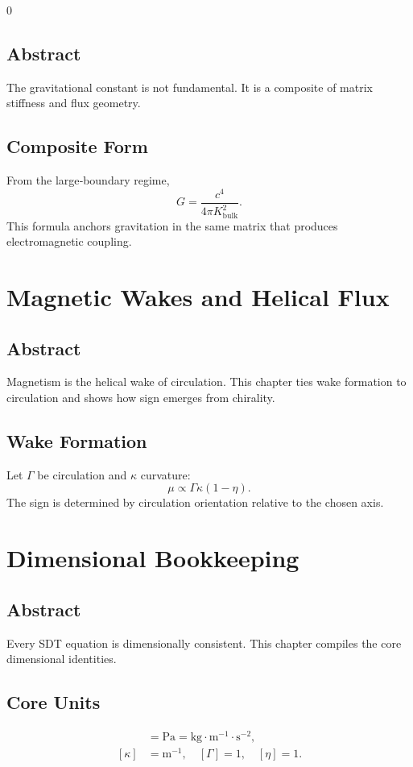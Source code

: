 0\documentclass[12pt]{book}
\begin{document}
\section*{Abstract}
The gravitational constant is not fundamental. It is a composite of matrix stiffness and flux geometry.

\section{Composite Form}
From the large‑boundary regime,
\begin{equation}
G = \frac{c^4}{4\pi K_{\text{bulk}}^2}.
\end{equation}
This formula anchors gravitation in the same matrix that produces electromagnetic coupling.

\chapter{Magnetic Wakes and Helical Flux}

\section*{Abstract}
Magnetism is the helical wake of circulation. This chapter ties wake formation to circulation and shows
how sign emerges from chirality.

\section{Wake Formation}
Let $\Gamma$ be circulation and $\kappa$ curvature:
\begin{equation}
\mu \propto \Gamma \kappa (1-\eta).
\end{equation}
The sign is determined by circulation orientation relative to the chosen axis.

\chapter{Dimensional Bookkeeping}

\section*{Abstract}
Every SDT equation is dimensionally consistent. This chapter compiles the core dimensional identities.

\section{Core Units}
\begin{align}
[P] &= \text{Pa} = \text{kg}\cdot \text{m}^{-1}\cdot \text{s}^{-2},\\
[\kappa] &= \text{m}^{-1},\quad [\Gamma]=1,\quad [\eta]=1.
\end{align}
\end{document}

